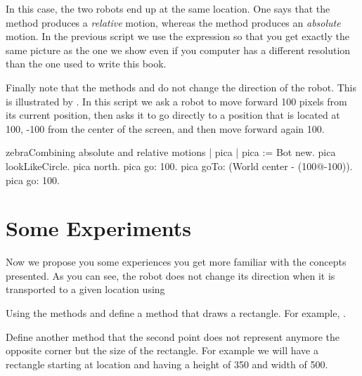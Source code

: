 In this case, the two robots end up at the same location. One says that the method \go produces a \emph{relative} motion, whereas the method  produces an \emph{absolute} motion. In the previous script we use the expression  so that you get exactly the same picture as the one we show even if you computer has a different resolution than the one used to 
write this book. 

Finally note that the methods \go and  do not change the direction of the robot. This is illustrated by . In this script we ask a robot to move forward 100 pixels from its current position, then  asks it to go directly to a position that is located at 100, -100 from the center of the screen, and then move forward again 100.

\begin{scriptfig}{zebra}{Combining absolute and relative motions}
\label{scr:combinedMove}
| pica |
pica := Bot new.
pica lookLikeCircle.
pica north.
pica go: 100.
pica goTo: (World center - (100@-100)).
pica go: 100.
\end{scriptfig}


\section{Some Experiments}
Now we propose you some experiences you get more familiar with the concepts presented.  As you can see, the robot does not change its direction when it is transported to a given location using 

\begin{exonofig}\label{exo:rectangle}
Using the methods  and  define a method  that draws a rectangle. For example, 
.
\end{exonofig}


\begin{exonofig}\label{exo:rectangle2}
Define another method  that the second point does not represent anymore the opposite corner but the size of the rectangle. For example  we will have a rectangle starting at location  and having a height of 350 and width of 500. \end{exonofig}

